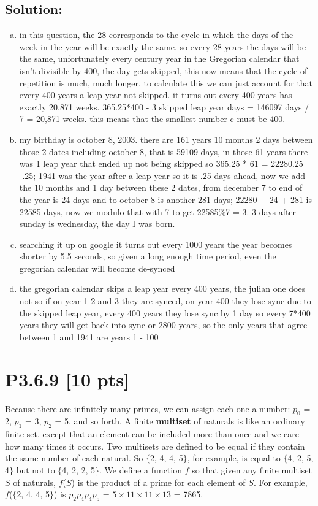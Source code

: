 \documentclass[12pt]{article}
\begin{document}
\subsection*{\textbf{Solution:}}
\begin{enumerate}[(a)]
    \item in this question, the 28 corresponds to the cycle in which the days of the week in the year will be exactly the same, so every 28 years the days will be the same, unfortunately every century year in the Gregorian calendar that isn't divisible by 400, the day gets skipped, this now means that the cycle of repetition is much, much longer. to calculate this we can just account for that every 400 years a leap year not skipped. it turns out every 400 years has exactly 20,871 weeks. 365.25*400 - 3 skipped leap year days = 146097 days / 7 = 20,871 weeks. this means that the smallest number c must be 400.

    \item my birthday is october 8, 2003. there are 161 years 10 months 2 days between those 2 dates including october 8, that is 59109 days, in those 61 years there was 1 leap year that ended up not being skipped so 365.25 * 61 = 22280.25 -.25; 1941 was the year after a leap year so it is .25 days ahead, now we add the 10 months and 1 day between these 2 dates, from december 7 to end of the year is 24 days and to october 8 is another 281 days; 22280 + 24 + 281 is 22585 days, now we modulo that with 7 to get 22585$\%$7 = 3. 3 days after sunday is wednesday, the day I was born.

    \item searching it up on google it turns out every 1000 years the year becomes shorter by 5.5 seconds, so given a long enough time period, even the gregorian calendar will become de-synced

    \item the gregorian calendar skips a leap year every 400 years, the julian one does not so if on year 1 2 and 3 they are synced, on year 400 they lose sync due to the skipped leap year, every 400 years they lose sync by 1 day so every 7*400 years they will get back into sync or 2800 years, so the only years that agree between 1 and 1941 are years 1 - 100
    
\end{enumerate}


\newpage
\section*{\textbf{P3.6.9} [10 pts]}
 Because there are infinitely many primes, we can assign each one a number: $p_0$ = 2, $p_1$ = 3, $p_2$ = 5, and so forth. A finite \textbf{multiset} of naturals is like an ordinary finite set, except that an element can be included more than once and we care how many times it occurs. Two multisets are defined to be equal if they contain the same number of each natural. So $\{$2, 4, 4, 5$\}$, for example, is equal to $\{$4, 2, 5, 4$\}$ but not to $\{$4, 2, 2, 5$\}$. We define a function $f$ so that given any finite multiset $S$ of naturals, $f$($S$) is the product of a prime for each element of $S$. For example, $f$($\{$2, 4, 4, 5$\}$) is $p_2p_4p_4p_5$ = $5 \times 11 \times 11 \times 13$ = 7865.
 
\end{document}
